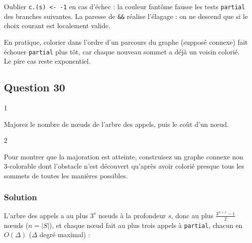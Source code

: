 \documentclass[11pt,a4paper]{article}
\newcommand{\equationajustee}[1]{%
  \sbox{\boiteequation}{$\displaystyle #1$}%
  \ifdim\wd\boiteequation>\linewidth
    \[\resizebox{\linewidth}{!}{\usebox{\boiteequation}}\]%
  \else
    \[#1\]%
  \fi}
\begin{document}
\begin{piege}

Oublier \texttt{c.(s)\ \textless{}-\ -1} en cas d'échec : la couleur fantôme fausse les tests \texttt{partial} des branches suivantes. La paresse de \texttt{\&\&} réalise l'élagage : on ne descend que si le choix courant est localement valide.

\end{piege}

\begin{methode}

En pratique, colorier dans l'ordre d'un parcours du graphe (supposé connexe) fait échouer \texttt{partial} plus tôt, car chaque nouveau sommet a déjà un voisin colorié. Le pire cas reste exponentiel.

\end{methode}

\hypertarget{question-30}{%
\subsection{Question 30}\label{question-30}}

\begin{indication}{1}

Majorez le nombre de nœuds de l'arbre des appels, puis le coût d'un nœud.

\end{indication}

\begin{indication}{2}

Pour montrer que la majoration est atteinte, construisez un graphe connexe non 3-colorable dont l'obstacle n'est découvert qu'après avoir colorié presque tous les sommets de toutes les manières possibles.

\end{indication}

\hypertarget{solution-29}{%
\subsubsection{Solution}\label{solution-29}}

L'arbre des appels a au plus \(3^s\) nœuds à la profondeur \(s\), donc au plus \(\frac{3^{n+1} - 1}{2}\) nœuds (\(n = |S|\)), et chaque nœud fait au plus trois appels à \texttt{partial}, chacun en \(O(\Delta)\) (\(\Delta\) degré maximal) :

\equationajustee{\boxed{\,C_{\text{pire}} = O\big(\Delta\,3^{|S|}\big) = O\big(|S|\,3^{|S|}\big)\,}}
\end{document}
